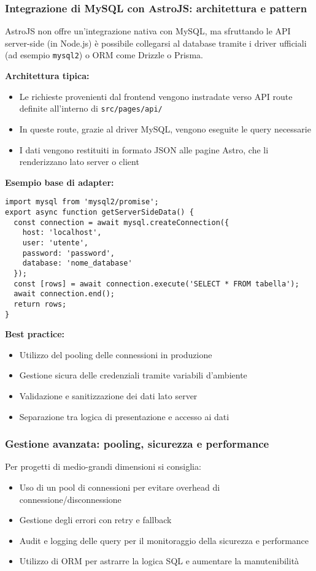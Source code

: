 \subsubsection{Integrazione di MySQL con AstroJS: architettura e pattern}
AstroJS non offre un’integrazione nativa con MySQL, ma sfruttando le API server-side (in Node.js) è possibile collegarsi al database tramite i driver ufficiali (ad esempio \texttt{mysql2}) o ORM come Drizzle o Prisma.

\textbf{Architettura tipica:}
\begin{itemize}
    \item Le richieste provenienti dal frontend vengono instradate verso API route definite all’interno di \texttt{src/pages/api/}
    \item In queste route, grazie al driver MySQL, vengono eseguite le query necessarie
    \item I dati vengono restituiti in formato JSON alle pagine Astro, che li renderizzano lato server o client
\end{itemize}

\textbf{Esempio base di adapter:}
\begin{verbatim}
import mysql from 'mysql2/promise';
export async function getServerSideData() {
  const connection = await mysql.createConnection({
    host: 'localhost',
    user: 'utente',
    password: 'password',
    database: 'nome_database'
  });
  const [rows] = await connection.execute('SELECT * FROM tabella');
  await connection.end();
  return rows;
}
\end{verbatim}

\textbf{Best practice:} 
\begin{itemize}
    \item Utilizzo del pooling delle connessioni in produzione
    \item Gestione sicura delle credenziali tramite variabili d’ambiente
    \item Validazione e sanitizzazione dei dati lato server
    \item Separazione tra logica di presentazione e accesso ai dati
\end{itemize}

\subsubsection{Gestione avanzata: pooling, sicurezza e performance}
Per progetti di medio-grandi dimensioni si consiglia:
\begin{itemize}
    \item Uso di un pool di connessioni per evitare overhead di connessione/disconnessione
    \item Gestione degli errori con retry e fallback
    \item Audit e logging delle query per il monitoraggio della sicurezza e performance
    \item Utilizzo di ORM per astrarre la logica SQL e aumentare la manutenibilità
\end{itemize}

